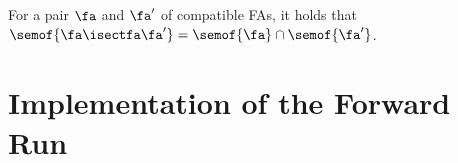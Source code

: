 \begin{lemma}
  For a pair $\fa$ and $\fa'$ of compatible FAs,
  it holds that
  $\semof{\fa \isectfa \fa'} = \semof{\fa} \cap \semof{\fa'}$.
\end{lemma}



\section{Implementation of the Forward Run}\label{sec:fwd_run}


